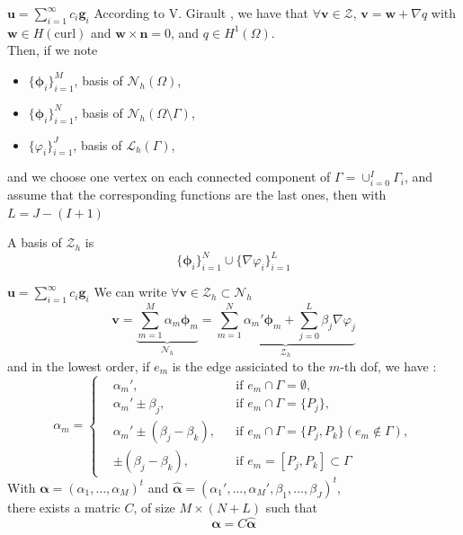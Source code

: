 \documentclass{beamer}
\newcommand{\Z}{{\bm{\mathcal{Z}}}}
\newcommand{\NN}{{\bm{\mathcal{N}}}}
\newcommand{\LLL}{{\bm{\mathcal{L}}}}
\newcommand{\grad}{{\nabla}}
\begin{document}
\begin{frame}{$\mathbf{u}=\sum_{i=1}^\infty c_i\mathbf{g}_i$}
  According to V. Girault \cite{girault90-1}, we have that $\forall\mathbf{v}\in\Z$, $\mathbf{v}=\mathbf{w}+\grad q$ with $\mathbf{w}\in H(\mathrm{curl})$ and $\mathbf{w}\times\mathbf{n}=0$, and $q \in H^1(\Omega)$.\\
  Then, if we note
  \begin{itemize}
  \item $\{\bm{\phi}_i\}_{i=1}^M$, basis of $\NN_h(\Omega)$,
  \item $\{\bm{\phi}_i\}_{i=1}^N$, basis of $\NN_h(\Omega\setminus\Gamma)$,
  \item $\{\varphi_i\}_{i=1}^J$, basis of $\LLL_h(\Gamma)$,
  \end{itemize}
  and we choose one vertex on each connected component of $\Gamma=\cup_{i=0}^I\Gamma_i$, and assume that the corresponding functions are the last ones, then with $L=J-(I+1)$
  \begin{block}{A basis of $\Z_h$ is}
    \[ \{\bm{\phi}_i\}_{i=1}^N\cup\{\grad\varphi_i\}_{i=1}^L \]
  \end{block}
\end{frame}

\begin{frame}{$\mathbf{u}=\sum_{i=1}^\infty c_i\mathbf{g}_i$}
  We can write $\forall \mathbf{v}\in \Z_h \subset \NN_h$
  \[ \mathbf{v}=\underbrace{\sum_{m=1}^M\alpha_m\bm{\phi}_m}_{\NN_h}=\underbrace{\sum_{m=1}^N\alpha_m'\bm{\phi}_m+ \sum_{j=0}^L \beta_j\grad\varphi_j}_{\Z_h} \]
  and in the lowest order, if $e_m$ is the edge assiciated to the $m$-th dof,  we have :
  \[
  \alpha_m=\left\{\begin{aligned}
  &\alpha_m', &&\mbox{if } e_m\cap\Gamma = \emptyset,\\
  &\alpha_m'\pm \beta_j, &&\mbox{if } e_m\cap\Gamma = \{P_j\},\\
  &\alpha_m'\pm (\beta_j-\beta_k), &&\mbox{if } e_m\cap\Gamma = \{P_j,P_k\}
  (e_m\notin\Gamma),\\
  &\pm (\beta_j-\beta_k), &&\mbox{if } e_m=[P_j,P_k]\subset\Gamma
  \end{aligned}\right.
  \]
  With $\bm{\alpha}=(\alpha_1,\dots,\alpha_M)^t$ and $\widehat{\bm{\alpha}}=(\alpha_1',\dots,\alpha_M',\beta_1,\dots,\beta_J)^t$,\\
  there exists a matric $C$, of size $M\times(N+L)$ such that \[\bm{\alpha}=C\widehat{\bm{\alpha}} \]
\end{frame}
\end{document}
